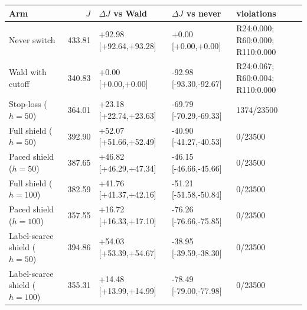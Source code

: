 \begin{tabular}{@{}l r l l l@{}}
\toprule
Arm & $J$ & $\Delta J$ vs Wald & $\Delta J$ vs never & violations \\
\midrule
Never switch & 433.81 & +92.98 [+92.64,+93.28] & +0.00 [+0.00,+0.00] & R24:0.000; R60:0.000; R110:0.000 \\
Wald with cutoff & 340.83 & +0.00 [+0.00,+0.00] & -92.98 [-93.30,-92.67] & R24:0.067; R60:0.004; R110:0.000 \\
Stop-loss ($h=50$) & 364.01 & +23.18 [+22.74,+23.63] & -69.79 [-70.29,-69.33] & 1374/23500 \\
Full shield ($h=50$) & 392.90 & +52.07 [+51.66,+52.49] & -40.90 [-41.27,-40.53] & 0/23500 \\
Paced shield ($h=50$) & 387.65 & +46.82 [+46.29,+47.34] & -46.15 [-46.66,-45.66] & 0/23500 \\
Full shield ($h=100$) & 382.59 & +41.76 [+41.37,+42.16] & -51.21 [-51.58,-50.84] & 0/23500 \\
Paced shield ($h=100$) & 357.55 & +16.72 [+16.33,+17.10] & -76.26 [-76.66,-75.85] & 0/23500 \\
Label-scarce shield ($h=50$) & 394.86 & +54.03 [+53.39,+54.67] & -38.95 [-39.59,-38.30] & 0/23500 \\
Label-scarce shield ($h=100$) & 355.31 & +14.48 [+13.99,+14.99] & -78.49 [-79.00,-77.98] & 0/23500 \\
\bottomrule
\end{tabular}
